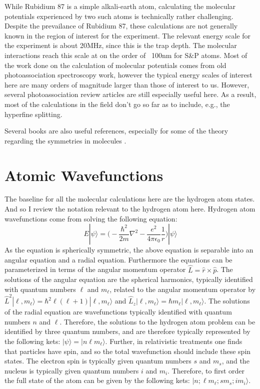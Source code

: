 \documentclass[prl, longbibliography]{revtex4-2}
\begin{document}
While Rubidium 87 is a simple alkali-earth atom, calculating the molecular potentials experienced by two such atoms is technically rather challenging. 
Despite the prevailance of Rubidium 87, these calculations are not generally known in the region of interest for the experiment. 
The relevant energy scale for the experiment is about 20MHz, since this is the trap depth. The molecular interactions reach this scale at on the order of ~100nm for S\&P atoms. 
Most of the work done on the calculation of molecular potentials comes from old photoassociation spectroscopy work, however the typical energy scales of interest here are many orders of magnitude larger than those of interest to us. However, several photoassociation review articles\cite{jones_ultracold_2006, weiner_experiments_1999} are still especially useful here.
As a result, most of the calculations in the field don't go so far as to include, e.g., the hyperfine splitting.

Several books are also useful references, especially for some of the theory regarding the symmetries in molecules \cite{lefebvre-brion_perturbations_1986}. 

\section{Atomic Wavefunctions}

The baseline for all the molecular calculations here are the hydrogen atom states. And so I review the notation relevant to the hydrogen atom here. Hydrogen atom wavefunctions come from solving the following equation:
\begin{equation}
E|\psi\rangle = \bigg(-\frac{\hbar^2}{2m}\nabla^2 - \frac{e^2}{4\pi\epsilon_0}\frac{1}{r}\bigg)|\psi\rangle
\end{equation}
As the equation is spherically symmetric, the above equation is separable into an angular equation and a radial equation. 
Furthermore the equations can be parameterized in terms of the angular momentum operator $\hat{L}=\hat{r}\times\hat{p}$. 
The solutions of the angular equation are the spherical harmonics, typically identified with quantum numbers $\ell$ and $m_\ell$, related to the angular momentum operator by $\hat{L}^2|\ell,m_\ell\rangle = \hbar^2 \ell (\ell+1)|\ell,m_\ell\rangle$ and $\hat{L}_z|\ell,m_\ell\rangle = \hbar m_\ell|\ell,m_\ell\rangle$.  
The solutions of the radial equation are wavefunctions typically identified with quantum numbers $n$ and $\ell$. 
Therefore, the solutions to the hydrogen atom problem can be identified by three quantum numbers, and are therefore typically represented by the following kets: $|\psi\rangle=|n\ell m_\ell\rangle$.
Further, in relativistic treatments one finds that particles have spin, and so the total wavefunction should include these spin states. 
The electron spin is typically given quantum numbers $s$ and $m_s$, and the nucleus is typically given quantum numbers $i$ and $m_i$.
Therefore, to first order the full state of the atom can be given by the following kets: $|n;\ell m_\ell; s m_s; i m_i\rangle$. 
\end{document}
